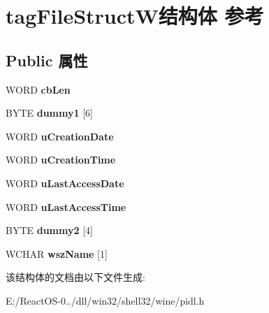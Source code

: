\hypertarget{structtag_file_struct_w}{}\section{tag\+File\+Struct\+W结构体 参考}
\label{structtag_file_struct_w}
\subsection*{Public 属性}
\begin{DoxyCompactItemize}
\item 
\mbox{\label{structtag_file_struct_w_af237839804700f98ba787a684880f654}} 
W\+O\+RD {\bfseries cb\+Len}
\item 
\mbox{\label{structtag_file_struct_w_ab63a4ac5610bc853378367b852e83aa4}} 
B\+Y\+TE {\bfseries dummy1} \mbox{[}6\mbox{]}
\item 
\mbox{\label{structtag_file_struct_w_ac586d80ce8ff3da763d5e99ddbf0b45f}} 
W\+O\+RD {\bfseries u\+Creation\+Date}
\item 
\mbox{\label{structtag_file_struct_w_a7a74235a28054aa19e9ed7c606d303c1}} 
W\+O\+RD {\bfseries u\+Creation\+Time}
\item 
\mbox{\label{structtag_file_struct_w_ada130f563d32a042a18cc17fae896f0e}} 
W\+O\+RD {\bfseries u\+Last\+Access\+Date}
\item 
\mbox{\label{structtag_file_struct_w_a952a16b84fe52f8a8cbda3aa2e945a35}} 
W\+O\+RD {\bfseries u\+Last\+Access\+Time}
\item 
\mbox{\label{structtag_file_struct_w_a540808d177445caa97b47e323853bba1}} 
B\+Y\+TE {\bfseries dummy2} \mbox{[}4\mbox{]}
\item 
\mbox{\label{structtag_file_struct_w_a1e57b4bfdcb129f31ae7ec3da8cb822d}} 
W\+C\+H\+AR {\bfseries wsz\+Name} \mbox{[}1\mbox{]}
\end{DoxyCompactItemize}


该结构体的文档由以下文件生成\+:\begin{DoxyCompactItemize}
\item 
E\+:/\+React\+O\+S-\/0../dll/win32/shell32/wine/pidl.\+h\end{DoxyCompactItemize}
